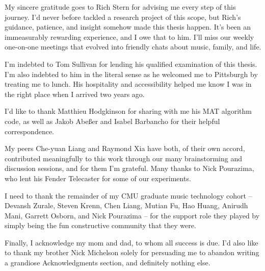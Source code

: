 \documentclass[12pt]{cmuthesis}
\begin{document}
\begin{acknowledgments}
My sincere gratitude goes to Rich Stern for advising me every step of this journey. I'd never before tackled a research project of this scope, but Rich's guidance, patience, and insight somehow made this thesis happen. It's been an immeasurably rewarding experience, and I owe that to him. I'll miss our weekly one-on-one meetings that evolved into friendly chats about music, family, and life.

I'm indebted to Tom Sullivan for lending his qualified examination of this thesis. I'm also indebted to him in the literal sense as he welcomed me to Pittsburgh by treating me to lunch. His hospitality and accessibility helped me know I was in the right place when I arrived two years ago.

I'd like to thank Matthieu Hodgkinson for sharing with me his MAT algorithm code, as well as Jakob Abe{\ss}er and Isabel Barbancho for their helpful correspondence. 

My peers Che-yuan Liang and Raymond Xia have both, of their own accord, contributed meaningfully to this work through our many brainstorming and discussion sessions, and for them I'm grateful. Many thanks to Nick Pourazima, who lent his Fender Telecaster for some of our experiments.

I need to thank the remainder of my CMU graduate music technology cohort -- Devansh Zurale, Steven Krenn, Chen Liang, Mutian Fu, Hao Huang, Anirudh Mani, Garrett Osborn, and Nick Pourazima -- for the support role they played by simply being the fun constructive community that they were.

Finally, I acknowledge my mom and dad, to whom all success is due. I'd also like to thank my brother Nick Michelson solely for persuading me to abandon writing a grandiose Acknowledgments section, and definitely nothing else.

\end{acknowledgments}



\tableofcontents
\listoffigures
\listoftables

\mainmatter


%
%
%
%
%
\doublespacing
\noindent
\end{document}
